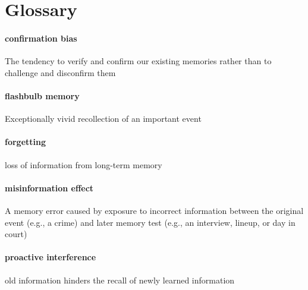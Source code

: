 \documentclass[
]{krantz}
\begin{document}
\hypertarget{glossary-5}{%
\section{Glossary}\label{glossary-5}}

\hypertarget{confirmation-bias}{%
\paragraph*{confirmation bias}\label{confirmation-bias}}

The tendency to verify and confirm our existing memories rather than to challenge and disconfirm them

\hypertarget{flashbulb-memory}{%
\paragraph*{flashbulb memory}\label{flashbulb-memory}}

Exceptionally vivid recollection of an important event

\hypertarget{forgetting-1}{%
\paragraph*{forgetting}\label{forgetting-1}}

loss of information from long-term memory

\hypertarget{misinformation-effect-1}{%
\paragraph*{misinformation effect}\label{misinformation-effect-1}}

A memory error caused by exposure to incorrect information between the original event (e.g., a crime) and later memory test (e.g., an interview, lineup, or day in court)

\hypertarget{proactive-interference}{%
\paragraph*{proactive interference}\label{proactive-interference}}

old information hinders the recall of newly learned information
\end{document}
